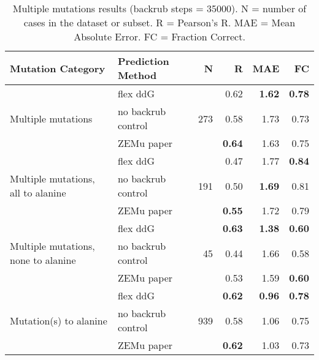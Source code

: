 \begin{table}
  \begin{tabular}{llrrrr}
\toprule
Mutation Category &   Prediction Method &    N &    R &  MAE &   FC \\
\midrule
 \multirow{ 3}{*}{Multiple mutations} & flex ddG & \multirow{ 3}{*}{273} & 0.62 & \textbf{1.62} & \textbf{0.78}  \\
 & no backrub control & & 0.58 & 1.73 & 0.73  \\
 & ZEMu paper & & \textbf{0.64} & 1.63 & 0.75  \\
\hline
 \multirow{ 3}{*}{Multiple mutations, all to alanine} & flex ddG & \multirow{ 3}{*}{191} & 0.47 & 1.77 & \textbf{0.84}  \\
 & no backrub control & & 0.50 & \textbf{1.69} & 0.81  \\
 & ZEMu paper & & \textbf{0.55} & 1.72 & 0.79  \\
\hline
 \multirow{ 3}{*}{Multiple mutations, none to alanine} & flex ddG & \multirow{ 3}{*}{45} & \textbf{0.63} & \textbf{1.38} & \textbf{0.60}  \\
 & no backrub control & & 0.44 & 1.66 & 0.58  \\
 & ZEMu paper & & 0.53 & 1.59 & \textbf{0.60}  \\
\hline
 \multirow{ 3}{*}{Mutation(s) to alanine} & flex ddG & \multirow{ 3}{*}{939} & \textbf{0.62} & \textbf{0.96} & \textbf{0.78}  \\
 & no backrub control & & 0.58 & 1.06 & 0.75  \\
 & ZEMu paper & & \textbf{0.62} & 1.03 & 0.73  \\
\bottomrule
\end{tabular}
  \caption[Multiple mutations results]{
    Multiple mutations results (backrub steps = 35000). N = number of cases in the dataset or subset. R = Pearson's R. MAE = Mean Absolute Error. FC = Fraction Correct.
  } \label{tab:table-mult}
\end{table}
